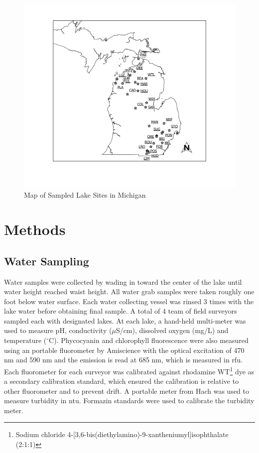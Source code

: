 \begin{figure}[!h]
\includegraphics[width=\textwidth]{figures/Overview}
\caption{Map of Sampled Lake Sites in Michigan}
\label{fig:overview}
\end{figure}

\clearpage
\section{Methods}
\subsection{Water Sampling} \label{sampling}

Water samples were collected by wading in toward the center of the lake until water height reached waist height. All water grab samples were taken roughly one foot below water surface. Each water collecting vessel was rinsed 3 times with the lake water before obtaining final sample. A total of 4 team of field surveyors sampled each with designated lakes. At each lake, a hand-held multi-meter was used to measure pH, conductivity ($\mu$S/cm), dissolved oxygen (mg/L) and temperature ($^\circ$C). Phycocyanin and chlorophyll fluorescence were also measured using an portable fluorometer by Amiscience with the optical excitation of 470 nm and 590 nm and the emission is read at 685 nm, which is measured in \gls{rfu}. Each fluorometer for each surveyor was calibrated against rhodamine WT\footnote{Sodium chloride 4-[3,6-bis(diethylamino)-9-xantheniumyl]isophthalate (2:1:1)} dye as a secondary calibration standard, which ensured the calibration is relative to other fluorometer and to prevent drift. A portable meter from Hach was used to measure turbidity in \gls{ntu}. Formazin standards were used to calibrate the turbidity meter.

